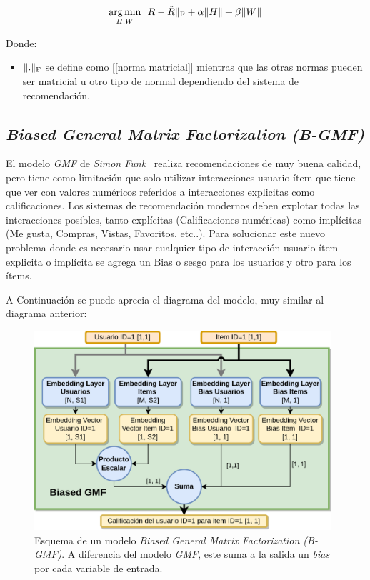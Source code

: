 \documentclass[11pt,a4paper,twoside]{thesis}
\begin{document}
\begin{equation}
	\underset{H, W}{\operatorname{arg\,min } }\, \|R - \tilde{R}\|_{\rm F} + \alpha\|H\| + \beta\|W\|
\end{equation}
\begin{description}
	\item[Donde:]
\end{description}
\begin{itemize}
	\item $\|.\|_{\rm F}$ se define como [[norma matricial]] mientras que las otras normas pueden ser matricial u otro tipo de normal dependiendo del sistema de recomendación.
\end{itemize}

\subsection{\textit{Biased General Matrix Factorization (B-GMF)}}

El modelo \textit{GMF} de \textit{Simon Funk}~\cite{afm, dlwkrs} realiza
recomendaciones de muy buena calidad, pero tiene como limitación que solo
utilizar interacciones usuario-ítem que tiene que ver con valores numéricos
referidos a interacciones explicitas como calificaciones. Los sistemas de
recomendación modernos deben explotar todas las interacciones posibles, tanto
explícitas (Calificaciones numéricas) como implícitas (Me gusta, Compras,
Vistas, Favoritos, etc..). Para solucionar este nuevo problema donde es
necesario usar cualquier tipo de interacción usuario ítem explicita o implícita
se agrega un Bias o sesgo para los usuarios y otro para los ítems.

A Continuación se puede aprecia el diagrama del modelo, muy similar al diagrama
anterior:

\begin{figure}[h!]
	\centering
	\includegraphics[width=11cm]{./images/Biased-GMF.png}
	\caption{
		Esquema de un modelo \textit{Biased General Matrix Factorization (B-GMF)}. A diferencia del modelo \textit{GMF}, este suma a la salida un \textit{bias} por cada variable de entrada.
	}
	\label{fig:BiasedGMFModel}
\end{figure}
\end{document}
